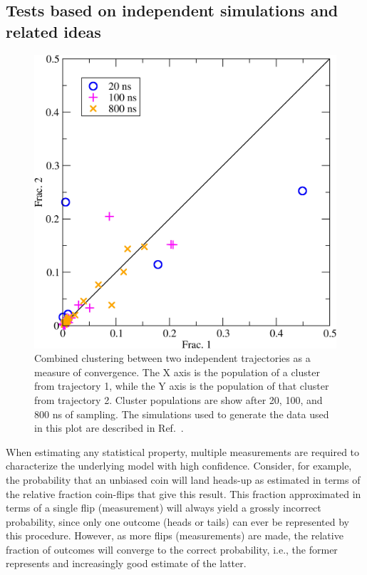 \subsection{Tests based on independent simulations and related ideas}

\begin{figure}
  \centering
  \includegraphics[width=0.9\linewidth]{figures/combinedcluster}
  \caption{Combined clustering between two independent trajectories as a measure of convergence. The X axis is the population of a cluster from trajectory 1, while the Y axis is the population of that cluster from trajectory 2. Cluster populations are show after 20, 100, and 800 ns of sampling. The simulations used to generate the data used in this plot are described in Ref.\ \citep{Roe2014}.}
  \label{f:combinedcluster}
\end{figure}

When estimating any statistical property, multiple measurements are required to characterize the underlying model with high confidence. Consider, for example, the probability that an unbiased coin will land heads-up as estimated in terms of the relative fraction coin-flips that give this result.  This fraction approximated in terms of a single flip (measurement) will always yield a grossly incorrect probability, since only one outcome (heads or tails) can ever be represented by this procedure.  However, as more flips (measurements) are made, the relative fraction of outcomes will converge to the correct probability, i.e., the former represents and increasingly good estimate of the latter.

